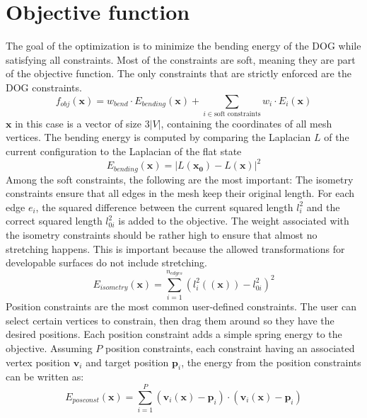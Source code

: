 \documentclass[a4paper,twoside,12pt,nochapterprefix]{scrbook}
\begin{document}
\section{Objective function}\label{sec:objective}
The goal of the optimization is to minimize the bending energy of the DOG while satisfying all constraints. Most of the constraints are soft, meaning they are part of the objective function. The only constraints that are strictly enforced are the DOG constraints.
\begin{equation}
f_{obj}(\mathbf{x}) = w_{bend} \cdot E_{bending}(\mathbf{x}) + \sum_{i \in \mbox{soft constraints}} w_i \cdot E_i(\mathbf{x})
\end{equation}
$\mathbf{x}$ in this case is a vector of size $3|V|$, containing the coordinates of all mesh vertices.\newline
The bending energy is computed by comparing the Laplacian $L$ of the current configuration to the Laplacian of the flat state
\begin{equation}
E_{bending}(\mathbf{x}) = |L(\mathbf{x_0}) - L(\mathbf{x})|^2
\end{equation}
Among the soft constraints, the following are the most important:\newline
The isometry constraints ensure that all edges in the mesh keep their original length. For each edge $e_i$, the squared difference between the current squared length $l_i^2$ and the correct squared length $l_{0i}^2$ is added to the objective. The weight associated with the isometry constraints should be rather high to ensure that almost no stretching happens. This is important because the allowed transformations for developable surfaces do not include stretching.
\begin{equation}
E_{isometry}(\mathbf{x}) = \sum_{i = 1}^{n_{edges}} (l_i^2((\mathbf{x})) - l_{0i}^2)^2
\end{equation}
Position constraints are the most common user-defined constraints. The user can select certain vertices to constrain, then drag them around so they have the desired positions. Each position constraint adds a simple spring energy to the objective. Assuming $P$ position constraints, each constraint having an associated vertex position $\mathbf{v}_i$ and target position $\mathbf{p}_i$, the energy from the position constraints can be written as:
\begin{equation}
E_{posconst}(\mathbf{x}) = \sum_{i = 1}^P (\mathbf{v}_i(\mathbf{x}) - \mathbf{p}_i) \cdot (\mathbf{v}_i(\mathbf{x}) - \mathbf{p}_i)
\end{equation}
\end{document}
